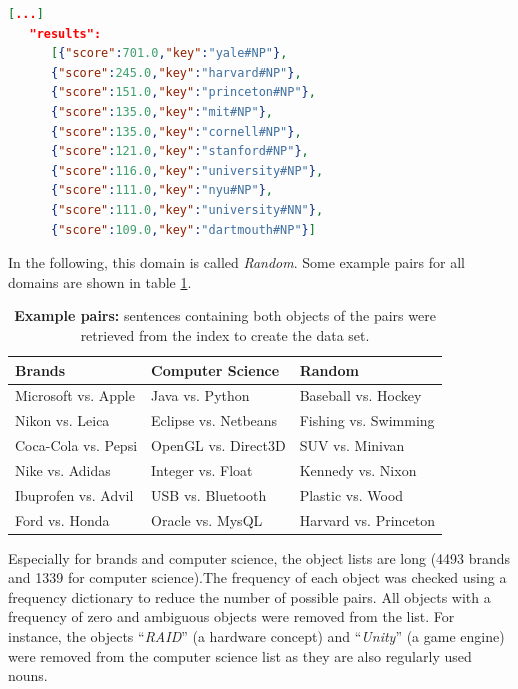 \begin{minipage}{\linewidth}

\begin{lstlisting}[language=json,label=lst:jbtres,caption=Similar words to "Yale"]
[...]
   "results":
      [{"score":701.0,"key":"yale#NP"},
      {"score":245.0,"key":"harvard#NP"},
      {"score":151.0,"key":"princeton#NP"},
      {"score":135.0,"key":"mit#NP"},
      {"score":135.0,"key":"cornell#NP"},
      {"score":121.0,"key":"stanford#NP"},
      {"score":116.0,"key":"university#NP"},
      {"score":111.0,"key":"nyu#NP"},
      {"score":111.0,"key":"university#NN"},
      {"score":109.0,"key":"dartmouth#NP"}]
\end{lstlisting}
\end{minipage}
In the following, this domain is called \emph{Random}. Some example pairs for all domains are shown in table \ref{tbl:exp_pairs}.
\begin{table}[h]
\centering
\caption{\textbf{Example pairs:} sentences containing both objects of the pairs were retrieved from the index to create the data set.}
\label{tbl:exp_pairs}

\begin{tabularx}{\textwidth}{XXX}
\toprule
Brands & Computer Science & Random \\
\midrule
Microsoft vs. Apple & Java vs. Python & Baseball vs. Hockey \\
Nikon vs. Leica & Eclipse vs. Netbeans & Fishing vs. Swimming\\
Coca-Cola vs. Pepsi & OpenGL vs. Direct3D & SUV vs. Minivan\\
Nike vs. Adidas & Integer vs. Float & Kennedy vs. Nixon\\
Ibuprofen vs. Advil & USB vs. Bluetooth & Plastic vs. Wood\\
Ford vs. Honda & Oracle vs. MysQL & Harvard vs. Princeton\\

\bottomrule

\end{tabularx}

\end{table}

Especially for brands and computer science, the object lists are long (4493 brands and 1339 for computer science).The frequency of each object was checked using a frequency dictionary to reduce the number of possible pairs. All objects with a frequency of zero and ambiguous objects were removed from the list. For instance, the objects \enquote{\emph{RAID}} (a hardware concept) and \enquote{\emph{Unity}}  (a game engine) were removed from the computer science list as they are also regularly used nouns.

